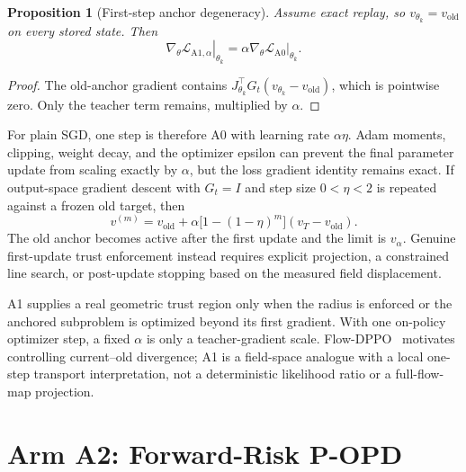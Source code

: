 \documentclass[11pt,a4paper]{article}
\newcommand{\vold}{v_{\mathrm{old}}}
\newcommand{\vT}{v_T}
\theoremstyle{plain}
\newtheorem{proposition}[theorem]{Proposition}
\theoremstyle{definition}
\begin{document}
\begin{proposition}[First-step anchor degeneracy]
\label{prop:a1-first-step}
Assume exact replay, so $v_{\theta_k}=\vold$ on every stored state.  Then
\begin{equation}
\left.
\nabla_\theta\mathcal L_{\mathrm{A1},\alpha}
\right|_{\theta_k}
=
\alpha
\left.
\nabla_\theta\mathcal L_{\mathrm{A0}}
\right|_{\theta_k}.
\label{eq:a1-first-gradient}
\end{equation}
\end{proposition}

\begin{proof}
The old-anchor gradient contains
$J_{\theta_k}^{\top}G_t(v_{\theta_k}-\vold)$, which is pointwise zero.  Only the
teacher term remains, multiplied by $\alpha$.
\end{proof}

For plain SGD, one step is therefore A0 with learning rate $\alpha\eta$.  Adam moments, clipping,
weight decay, and the optimizer epsilon can prevent the final parameter update from scaling
exactly by $\alpha$, but the loss gradient identity remains exact.  If output-space gradient
descent with $G_t=I$ and step size $0<\eta<2$ is repeated against a frozen old target, then
\begin{equation}
v^{(m)}
=
\vold
+\alpha\bigl[1-(1-\eta)^m\bigr](\vT-\vold).
\label{eq:a1-inner-steps}
\end{equation}
The old anchor becomes active after the first update and the limit is $v_\alpha$.  Genuine
first-update trust enforcement instead requires explicit projection, a constrained line search,
or post-update stopping based on the measured field displacement.

\begin{tcolorbox}[colback=gray!5,colframe=gray!55,title=Practical meaning of Arm A1]
A1 supplies a real geometric trust region only when the radius is enforced or the anchored
subproblem is optimized beyond its first gradient.  With one on-policy optimizer step, a fixed
$\alpha$ is only a teacher-gradient scale.  Flow-DPPO~\cite{flowdppo} motivates controlling
current--old divergence; A1 is a field-space analogue with a local one-step transport
interpretation, not a deterministic likelihood ratio or a full-flow-map projection.
\end{tcolorbox}

\section{Arm A2: Forward-Risk P-OPD}
\label{sec:a2}
\end{document}
